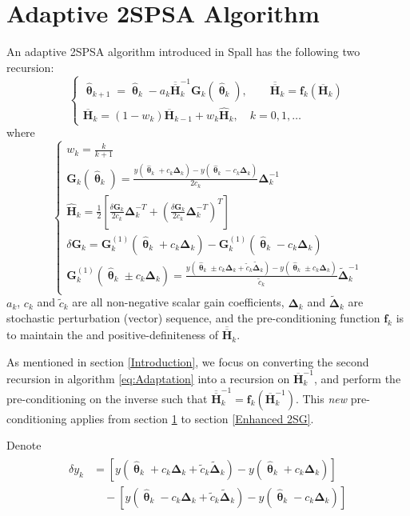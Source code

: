 \documentclass[conference]{IEEEtran}
\newcommand{\bG}{\bm{G}}
\newcommand{\bDelta}{\bm{\Delta}}
\newcommand{\oH}{\bm{\overline{H}}}
\newcommand{\ooH}{\bm{\overline{\overline{H}}}}
\newcommand{\hH}{\bm{\hat{H}}}
\newcommand{\htheta}{\bm{\hat{\uptheta}}}
\newcommand{\tDelta}{\bm{\tilde{\Delta}}}
\begin{document}
\section{Adaptive 2SPSA Algorithm} \label{2SPSA}
An adaptive 2SPSA algorithm introduced in Spall \cite{Spall2000} has the following two recursion:
\begin{equation} \label{eq:Adaptation}
\begin{cases}
\htheta_{k+1}=\htheta_k-a_k\ooH_k^{-1} \bG_k(\htheta_k),\qquad \bm{\ooH}_k=\bm{f}_k(\oH_k)\\
\oH_k= (1 - w_k) \oH_{k-1}+ w_k \hH_k, \quad k=0,1,\dots
\end{cases}
\end{equation}
where
\begin{equation} \label{eq:notations}
\begin{cases}
w_k=\frac{k}{k+1}\\
\bG_k(\htheta_k)=\frac{y(\htheta_k+c_k\bDelta_k)-y(\htheta_k-c_k\bDelta_k)}{2c_k}\bDelta_k^{-1}\\
\hH_k=\frac{1}{2}\left[ \frac{\delta\bG_k}{2c_k}\bDelta_k^{-T}+\left(\frac{\delta\bG_k}{2c_k}\bDelta_k^{-T}\right)^T \right]\\
\delta\bG_k=\bG_k^{(1)}(\htheta_k+ c_k\bDelta_k)-\bG_k^{(1)}(\htheta_k- c_k\bDelta_k)\\
\bG_k^{(1)}(\htheta_k\pm c_k\bDelta_k)
=\frac{y(\htheta_k\pm c_k\bDelta_k+\tilde{c}_k\tDelta_k)-y(\htheta_k\pm c_k\bDelta_k)}{\tilde{c}_k}\tDelta_k^{-1}\\
\end{cases}
\end{equation}
$ a_k $, $ c_k $ and $ \tilde{c}_k $ are all non-negative scalar gain coefficients, $ \bDelta_k $ and $ \tDelta_k $ are stochastic perturbation (vector) sequence, and the pre-conditioning function $ \bm{f}_k $ is to maintain the and positive-definiteness of $ \ooH_k $.

As mentioned in section \ref{Introduction}, we focus on converting the second recursion in algorithm \ref{eq:Adaptation} into a recursion on $\oH_k^{-1}$, and perform the pre-conditioning on the inverse such that $\bm{\ooH}_k^{-1}=\bm{f}_k(\oH_k^{-1})$. This \textit{new} pre-conditioning applies from section \ref{2SPSA} to section \ref{Enhanced 2SG}.

Denote
\begin{align} \label{eq:dy}
\begin{split}
\delta y_k&=[y(\htheta_k+c_k\bDelta_k+\tilde{c}_k\tDelta_k)-y(\htheta_k+c_k\bDelta_k)]\\
&\quad-[y(\htheta_k-c_k\bDelta_k+\tilde{c}_k\tDelta_k)-y(\htheta_k-c_k\bDelta_k)]
\end{split}
\end{align}
\end{document}
